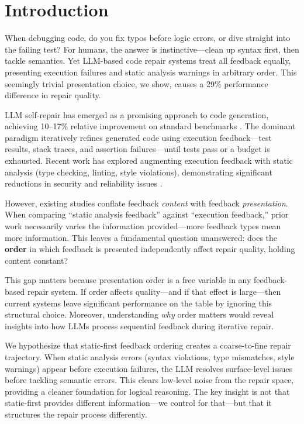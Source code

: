 \section{Introduction}

When debugging code, do you fix typos before logic errors, or dive straight into the failing test? For humans, the answer is instinctive---clean up syntax first, then tackle semantics. Yet LLM-based code repair systems treat all feedback equally, presenting execution failures and static analysis warnings in arbitrary order. This seemingly trivial presentation choice, we show, causes a 29\% performance difference in repair quality.

LLM self-repair has emerged as a promising approach to code generation, achieving 10--17\% relative improvement on standard benchmarks \citep{olausson2023selfrepair}. The dominant paradigm iteratively refines generated code using execution feedback---test results, stack traces, and assertion failures---until tests pass or a budget is exhausted. Recent work has explored augmenting execution feedback with static analysis (type checking, linting, style violations), demonstrating significant reductions in security and reliability issues \citep{blyth2025static}.

However, existing studies conflate feedback \emph{content} with feedback \emph{presentation}. When comparing ``static analysis feedback'' against ``execution feedback,'' prior work necessarily varies the information provided---more feedback types mean more information. This leaves a fundamental question unanswered: does the \textbf{order} in which feedback is presented independently affect repair quality, holding content constant?

This gap matters because presentation order is a free variable in any feedback-based repair system. If order affects quality---and if that effect is large---then current systems leave significant performance on the table by ignoring this structural choice. Moreover, understanding \emph{why} order matters would reveal insights into how LLMs process sequential feedback during iterative repair.

We hypothesize that static-first feedback ordering creates a coarse-to-fine repair trajectory. When static analysis errors (syntax violations, type mismatches, style warnings) appear before execution failures, the LLM resolves surface-level issues before tackling semantic errors. This clears low-level noise from the repair space, providing a cleaner foundation for logical reasoning. The key insight is not that static-first provides different information---we control for that---but that it structures the repair process differently.

